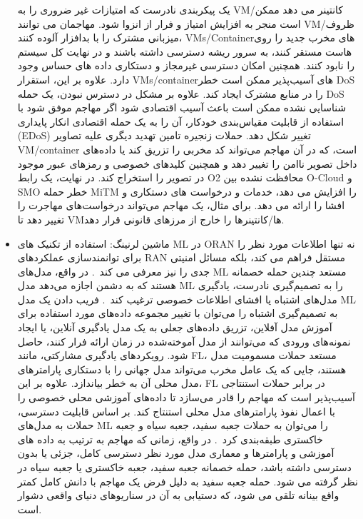\begin{itemize}
یک پیکربندی نادرست که امتیازات غیر ضروری را به VM/کانتینر می دهد ممکن است منجر به افزایش امتیاز و فرار از انزوا شود. مهاجمان می توانند VM/ظروف میزبانی مشترک را با بدافزار آلوده کنند، VMs/Containerهای مخرب جدید را روی هاست مستقر کنند، به سرور ریشه دسترسی داشته باشند و در نهایت کل سیستم را نابود کنند. همچنین امکان دسترسی غیرمجاز و دستکاری داده های حساس وجود دارد.
علاوه بر این، استقرار VMs/containerهای آسیب‌پذیر ممکن است خطر DoS را در منابع مشترک ایجاد کند. علاوه بر مشکل در دسترس نبودن، یک حمله DoS شناسایی نشده ممکن است باعث آسیب اقتصادی شود اگر مهاجم موفق شود با استفاده از قابلیت مقیاس‌بندی خودکار، آن را به یک حمله اقتصادی انکار پایداری (EDoS) تغییر شکل دهد. حملات زنجیره تامین تهدید دیگری علیه تصاویر VM/container است، که در آن مهاجم می‌تواند کد مخربی را تزریق کند یا داده‌های داخل تصویر ناامن را تغییر دهد و همچنین کلیدهای خصوصی و رمزهای عبور موجود در تصویر را استخراج کند. در نهایت، یک رابط O2 محافظت نشده بین O-Cloud و SMO خطر حمله MiTM را افزایش می دهد، خدمات و درخواست های دستکاری و افشا را ارائه می دهد. برای مثال، یک مهاجم می‌تواند درخواست‌های مهاجرت را تغییر دهد تا VMها/کانتینرها را خارج از مرزهای قانونی قرار دهد.
\item ماشین لرنینگ:
استفاده از تکنیک های ML در ORAN نه تنها اطلاعات مورد نظر را برای توانمندسازی عملکردهای RAN مستقل فراهم می کند، بلکه مسائل امنیتی جدی را نیز معرفی می کند~\cite{mimran2022evaluating}. در واقع، مدل‌های ML مستعد چندین حمله خصمانه هستند که به دشمن اجازه می‌دهد مدل ML را به تصمیم‌گیری نادرست، یادگیری مدل‌های اشتباه یا افشای اطلاعات خصوصی ترغیب کند~\cite{aisecme}. فریب دادن یک مدل ML به تصمیم‌گیری اشتباه را می‌توان با تغییر مجموعه داده‌های مورد استفاده برای آموزش مدل آفلاین، تزریق داده‌های جعلی به یک مدل یادگیری آنلاین، یا ایجاد نمونه‌های ورودی که می‌توانند از مدل آموخته‌شده در زمان ارائه فرار کنند، حاصل شود. رویکردهای یادگیری مشارکتی، مانند FL، مستعد حملات مسمومیت مدل هستند، جایی که یک عامل مخرب می‌تواند مدل جهانی را با دستکاری پارامترهای مدل محلی آن به خطر بیاندازد. علاوه بر این، FL در برابر حملات استنتاجی آسیب‌پذیر است که مهاجم را قادر می‌سازد تا داده‌های آموزشی محلی خصوصی را با اعمال نفوذ پارامترهای مدل محلی استنتاج کند.
بر اساس قابلیت دسترسی، حملات به مدل‌های ML را می‌توان به حملات جعبه سفید، جعبه سیاه و جعبه خاکستری طبقه‌بندی کرد~\cite{aisecme}. در واقع، زمانی که مهاجم به ترتیب به داده های آموزشی و پارامترها و معماری مدل مورد نظر دسترسی کامل، جزئی یا بدون دسترسی داشته باشد، حمله خصمانه جعبه سفید، جعبه خاکستری یا جعبه سیاه در نظر گرفته می شود. حمله جعبه سفید به دلیل فرض یک مهاجم با دانش کامل کمتر واقع بینانه تلقی می شود، که دستیابی به آن در سناریوهای دنیای واقعی دشوار است.
\end{itemize}
